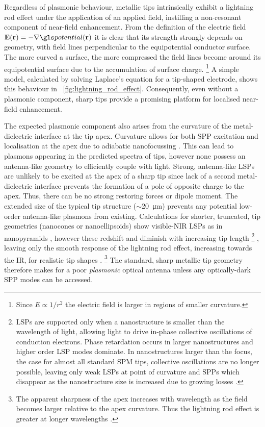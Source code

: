 \documentclass{article}
\begin{document}
Regardless of plasmonic behaviour, metallic tips intrinsically exhibit a lightning rod effect under the application of an applied field, instilling a non-resonant component of near-field enhancement. From the definition of the electric field $\vec{E}(\vec{r}) = -\nabla\pot(\vec{r})$ it is clear that its strength strongly depends on geometry, with field lines perpendicular to the equipotential conductor surface. The more curved a surface, the more compressed the field lines become around its equipotential surface due to the accumulation of surface charge.%
\footnote{Since $E \propto 1/r^2$ the electric field is larger in regions of smaller curvature.}
A simple model, calculated by solving Laplace's equation for a tip-shaped electrode, shows this behaviour in \figurename~\ref{fig:lightning_rod_effect}. Consequently, even without a plasmonic component, sharp tips provide a promising platform for localised near-field enhancement.

The expected plasmonic component also arises from the curvature of the metal-dielectric interface at the tip apex. Curvature allows for both SPP excitation and localisation at the apex due to adiabatic nanofocussing \cite{stockman2004, pile2006, berweger2010, lee2011, berweger2012, lindquist2013}. This can lead to plasmons appearing in the predicted spectra of tips, however none possess an antenna-like geometry to efficiently couple with light. Strong, antenna-like LSPs are unlikely to be excited at the apex of a sharp tip since lack of a second metal-dielectric interface prevents the formation of a pole of opposite charge to the apex. Thus, there can be no strong restoring forces or dipole moment. The extended size of the typical tip structure ($\sim$\SI{20}{\micro\metre}) prevents any potential low-order antenna-like plasmons from existing. Calculations for shorter, truncated, tip geometries (nanocones or nanoellipsoids) show visible-NIR LSPs \cite{roth2006, goncharenko2006} as in nanopyramids \cite{schafer2013, cherukulappurath2013}, however these redshift and diminish with increasing tip length%
\footnote{LSPs are supported only when a nanostructure is smaller than the wavelength of light, allowing light to drive in-phase collective oscillations of conduction electrons. Phase retardation occurs in larger nanostructures and higher order LSP modes dominate. In nanostructures larger than the focus, the case for almost all standard SPM tips, collective oscillations are no longer possible, leaving only weak LSPs at point of curvature and SPPs which disappear as the nanostructure size is increased due to growing losses \cite{zhang2009}.}
, leaving only the smooth response of the lightning rod effect, increasing towards the IR, for realistic tip shapes \cite{zhang2009, huber2014}.%
\footnote{The apparent sharpness of the apex increases with wavelength as the field becomes larger relative to the apex curvature. Thus the lightning rod effect is greater at longer wavelengths \cite{zhang2009}.}
The standard, sharp metallic tip geometry therefore makes for a poor \textit{plasmonic} optical antenna unless any optically-dark SPP modes can be accessed.
\end{document}
